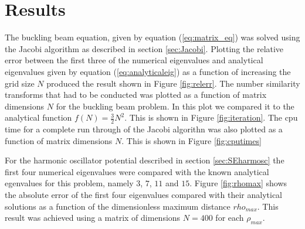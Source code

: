 \documentclass[twocolumn]{aastex62}
\begin{document}
\section{Results} \label{sec:results}
The buckling beam equation, given by equation (\ref{eq:matrix_eq}) was solved using the Jacobi algorithm as described in section \ref{sec:Jacobi}. Plotting the relative error between the first three of the numerical eigenvalues and analytical eigenvalues given by equation (\ref{eq:analyticaleig}) as a function of increasing the grid size $N$ produced the result shown in Figure \ref{fig:relerr}. The number similarity transforms that had to be conducted was plotted as a function of matrix dimensions $N$ for the buckling beam problem. In this plot we compared it to the analytical function $f(N)=\frac{3}{2}N^2$. This is shown in Figure \ref{fig:iteration}. The cpu time for a complete run through of the Jacobi algorithn was also plotted as a function of matrix dimensions $N$.  This is shown in Figure \ref{fig:cputimes}\\\indent
\begin{figure*}[h]
	\caption{Figure showing the relative error between the numerical and analytical eigenvalues ,given by equation \ref{eq:analyticaleig}, as a function of $n$ for the buckling beam problem given by \ref{eq:matrix_eq}. Here $n$ starts at $n=3$. }
	\label{fig:relerr}
\end{figure*}
\begin{figure*}[h]
	\caption{Figure showing the number of similarity transforms conducted before the off-diagonal elements are set below a tolerance when solving the buckling beam problem using the Jacobi algorithm.}
	\label{fig:iteration}
\end{figure*}
\begin{figure*}[h]
	\caption{Figure showing the CPU time as a function of matrix dimension $N$ when solving the buckling beam problem with the jacobi algorithm. The data is compared with the analytical function $f(N)=\frac{3}{2}N^2$.}
	\label{fig:cputimes}
\end{figure*}
For the harmonic oscillator potential described in section \ref{sec:SEharmosc} the first four numerical eigenvalues were compared with the known analytical egenvalues for this problem, namely $3$, $7$, $11$ and $15$. Figure \ref{fig:rhomax} shows the absolute error of the first four eigenvalues compared with their analytical solutions as a function of the dimensionless maximum distance $rho_{max}$. This result was achieved using a matrix of dimensions $N=400$ for each $\rho_{max}$.\\\indent
\end{document}
